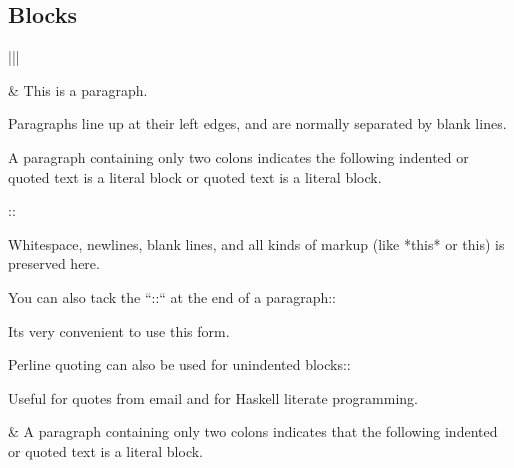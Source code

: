 \documentclass[letterpaper,10pt,english]{sphinxmanual}
\begin{document}
\subsection{Blocks}
\label{\detokenize{rst-cheatsheet/rst-cheatsheet:blocks}}

\begin{savenotes}\sphinxattablestart
\centering
\begin{tabular}[t]{|*{2}{|}}
\hline

\begin{sphinxVerbatimintable}[commandchars=\\\{\}]
   

        
    
\end{sphinxVerbatimintable}
&
This is a paragraph.

Paragraphs line up at their left
edges, and are normally separated
by blank lines.
\\
\hline
\begin{sphinxVerbatimintable}[commandchars=\\\{\}]
A paragraph containing only two colons indicates
the following indented or quoted text is a literal
block or quoted text is a literal block.

::

  Whitespace, newlines, blank lines, and  all kinds of
  markup (like *this* or \PYGZbs{}this) is preserved here.

You can also tack the ``::`` at the end of a
paragraph::

   It\PYGZsq{}s very convenient to use this form.

Per\PYGZhy{}line quoting can also be used for unindented
blocks::

\PYGZgt{} Useful for quotes from email and
\PYGZgt{} for Haskell literate programming.
\end{sphinxVerbatimintable}
&
A paragraph containing only two colons
indicates that the following indented
or quoted text is a literal block.

\begin{sphinxVerbatimintable}[commandchars=\\\{\}]
    
      
\PYGZbs{}     
\end{sphinxVerbatimintable}


\end{tabular}
\end{savenotes}
\end{document}
